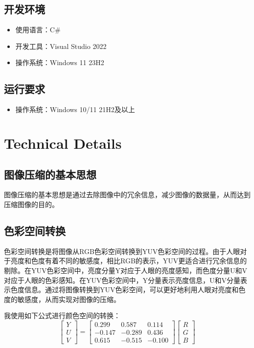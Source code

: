 \documentclass{article}
\begin{document}
\subsection{开发环境}

\begin{itemize}
    \item 使用语言：C\#
    \item 开发工具：Visual Studio 2022
    \item 操作系统：Windows 11 23H2
\end{itemize}

\subsection{运行要求}

\begin{itemize}
    \item 操作系统：Windows 10/11 21H2及以上
\end{itemize}

\section{Technical Details}

\subsection{图像压缩的基本思想}

图像压缩的基本思想是通过去除图像中的冗余信息，减少图像的数据量，从而达到压缩图像的目的。

\subsection{色彩空间转换}

色彩空间转换是将图像从RGB色彩空间转换到YUV色彩空间的过程。由于人眼对于亮度和色度有着不同的敏感度，相比RGB的表示，YUV更适合进行冗余信息的剔除。在YUV色彩空间中，亮度分量Y对应于人眼的亮度感知，而色度分量U和V对应于人眼的色彩感知。在YUV色彩空间中，Y分量表示亮度信息，U和V分量表示色度信息。通过将图像转换到YUV色彩空间，可以更好地利用人眼对亮度和色度的敏感度，从而实现对图像的压缩。

我使用如下公式进行颜色空间的转换：
\[
\begin{bmatrix}
    Y \\
    U \\
    V
\end{bmatrix}
=
\begin{bmatrix}
    0.299 & 0.587 & 0.114 \\
    -0.147 & -0.289 & 0.436 \\
    0.615 & -0.515 & -0.100
\end{bmatrix}
\begin{bmatrix}
    R \\
    G \\
    B
\end{bmatrix}    
\]
\end{document}

